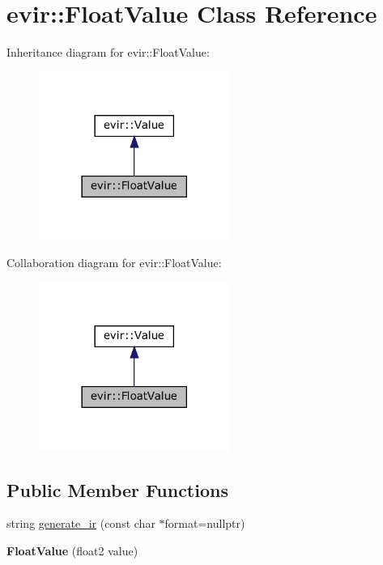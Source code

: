 \hypertarget{classevir_1_1FloatValue}{}\section{evir\+:\+:Float\+Value Class Reference}
\label{classevir_1_1FloatValue}


Inheritance diagram for evir\+:\+:Float\+Value\+:\nopagebreak
\begin{figure}[H]
\begin{center}
\leavevmode
\includegraphics[width=177pt]{classevir_1_1FloatValue__inherit__graph}
\end{center}
\end{figure}


Collaboration diagram for evir\+:\+:Float\+Value\+:\nopagebreak
\begin{figure}[H]
\begin{center}
\leavevmode
\includegraphics[width=177pt]{classevir_1_1FloatValue__coll__graph}
\end{center}
\end{figure}
\subsection*{Public Member Functions}
\begin{DoxyCompactItemize}
\item 
string \hyperlink{classevir_1_1FloatValue_a775e25d41c34aca73ed9418963bb652b}{generate\+\_\+ir} (const char $\ast$format=nullptr)
\item 
\mbox{\label{classevir_1_1FloatValue_a99da4695fa2baf5e8b397e03dc2fca4a}} 
{\bfseries Float\+Value} (float2 value)
\end{DoxyCompactItemize}
